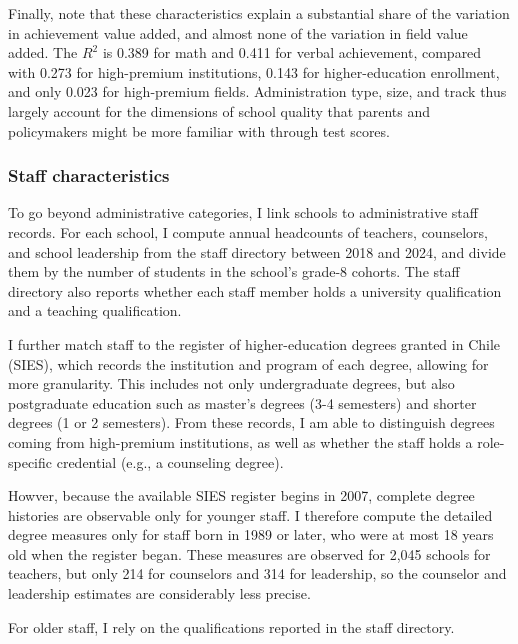 \documentclass[a4paper, article, english, oneside, unknownkeysallowed, 12pt]{memoir}
\begin{document}
Finally, note that these characteristics explain a substantial share of the variation in achievement value added, and almost none of the variation in field value added. 
The $R^2$ is 0.389 for math and 0.411 for verbal achievement, compared with 0.273 for high-premium institutions, 0.143 for higher-education enrollment, and only 0.023 for high-premium fields.
Administration type, size, and track thus largely account for the dimensions of school quality that parents and policymakers might be more familiar with through test scores. 



\subsubsection{Staff characteristics}


To go beyond administrative categories, I link schools to administrative staff records. 
For each school, I compute annual headcounts of teachers, counselors, and school leadership from the staff directory between 2018 and 2024, and divide them by the number of students in the school's grade-8 cohorts.
The staff directory also reports whether each staff member holds a university qualification and a teaching qualification. 

I further match staff to the register of higher-education degrees granted in Chile (SIES), which records the institution and program of each degree, allowing for more granularity.
This includes not only undergraduate degrees, but also postgraduate education such as master's degrees (3-4 semesters) and shorter degrees (1 or 2 semesters).
From these records, I am able to distinguish degrees coming from high-premium institutions, as well as whether the staff holds a role-specific credential (e.g., a counseling degree).

Howver, because the available SIES register begins in 2007, complete degree histories are observable only for younger staff. 
I therefore compute the detailed degree measures only for staff born in 1989 or later, who were at most 18 years old when the register began.
These measures are observed for 2,045 schools for teachers, but only 214 for counselors and 314 for leadership, so the counselor and leadership estimates are considerably less precise. 

For older staff, I rely on the qualifications reported in the staff directory.
\end{document}
